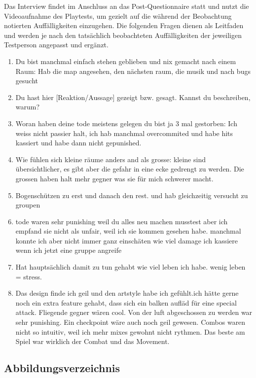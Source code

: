 \documentclass[../Main.tex]{subfiles}
\begin{document}
Das Interview findet im Anschluss an das Post-Questionnaire statt und nutzt die Videoaufnahme des Playtests, um gezielt auf die während der Beobachtung notierten Auffälligkeiten einzugehen. Die folgenden Fragen dienen als Leitfaden und werden je nach den tatsächlich beobachteten Auffälligkeiten der jeweiligen Testperson angepasst und ergänzt.

\begin{enumerate}[label=\textbf{I\arabic*}, leftmargin=1.5cm, itemsep=0.5em]
\item Du bist manchmal einfach stehen geblieben und nix gemacht nach einem Raum: Hab die map angesehen, den nächsten raum, die musik und nach bugs gesucht
\item Du hast hier [Reaktion/Aussage] gezeigt bzw. gesagt. Kannst du beschreiben, warum?
\item Woran haben deine tode meistens gelegen du bist ja 3 mal gestorben: Ich weiss nicht passier halt, ich hab manchmal overcommited und habe hits kassiert und habe dann nicht gepunished.
\item Wie fühlen sich kleine räume anders and als grosse: kleine sind übersichtlicher, es gibt aber die gefahr in eine ecke gedrengt zu werden. Die grossen haben halt mehr gegner was sie für mich schwerer macht.
\item Bogenschützen zu erst und danach den rest. und hab gleichzeitig versucht zu groupen
\item tode waren sehr punishing weil du alles neu machen musstest aber ich empfand sie nicht als unfair, weil ich sie kommen gesehen habe. manchmal konnte ich aber nicht immer ganz einschäten wie viel damage ich kassiere wenn ich jetzt eine gruppe angreife
\item Hat hauptsächlich damit zu tun gehabt wie viel leben ich habe. wenig leben = stress.
\item Das design finde ich geil und den artstyle habe ich gefühlt.ich hätte gerne noch ein extra feature gehabt, dass sich ein balken aufläd für eine special attack. Fliegende gegner wären cool. Von der luft abgeschossen zu werden war sehr punishing. Ein checkpoint wäre auch noch geil gewesen. Combos waren nicht so intuitiv, weil ich mehr mixes gewohnt nicht rythmen. Das beste am Spiel war wirklich der Combat und das Movement.
\end{enumerate}

\subsection{Abbildungsverzeichnis}
\end{document}
